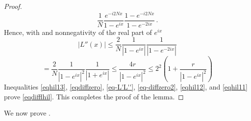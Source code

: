 \begin{proof}
\begin{equation}
           \frac 1N \frac {e^{-i2Nx}}{1-e^{ix}}
     \frac{1-e^{-i2Nx}}{1-e^{-2ix}}\, .
\end{equation}
Hence, with  and nonnegativity of the real part of $e^{ix}$
\begin{equation*}
    |L''(x)|
 \le \frac 2 N \frac {1}{|1-e^{ix}|}
     \frac{1}{|1-e^{-2ix}|}
 \end{equation*}
\begin{equation}\label{eqhil11}
    = \frac 2 N \frac {1}{|1-e^{ix}|^2}
     \frac{1}{|1+e^{ix}|}\le
 \frac {4r}{|1-e^{ix}|^2}\le 2^{2} \left (1+\frac {r}{|1-e^{ix}|^2}\right)
\end{equation}
Inequalities \eqref{eqhil13}, \eqref{eqdiffzero}, \eqref{eq-L'L''}, \eqref{eq-diffzero2}, \eqref{eqhil12}, and \eqref{eqhil11} prove \eqref{eqdifflhil}. This completes the proof of the lemma.
\end{proof}


We now prove .

